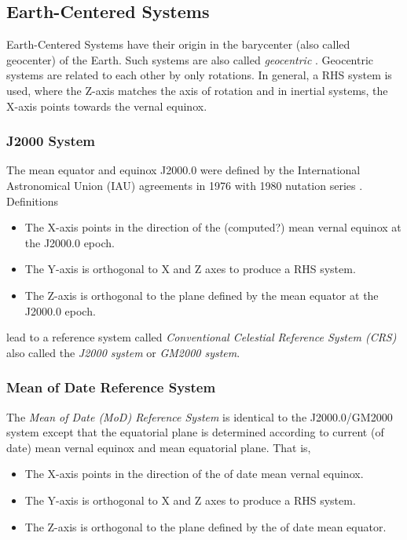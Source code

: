 \documentclass [12pt, a4paper] {article}
\begin{document}
\subsection{Earth-Centered Systems}
Earth-Centered Systems have their origin in the barycenter (also called geocenter) of
the Earth. Such systems are also called \emph{geocentric} \cite{gnss}.
Geocentric systems are related to each other by only rotations. 
In general, a RHS system is used, where the Z-axis matches the axis of rotation and in 
inertial systems, the X-axis points towards the vernal equinox.

\subsubsection{J2000 System}
The mean equator and equinox J2000.0 were defined by the International Astronomical Union 
(IAU) agreements in 1976 with 1980 nutation series \cite{GNSS}. Definitions
\begin {itemize}
  \item The X-axis points in the direction of the (computed?) mean vernal equinox at the 
  J2000.0 epoch.
  \item The Y-axis is orthogonal to X and Z axes to produce a RHS system.
  \item The Z-axis is orthogonal to the plane defined by the mean equator at the 
  J2000.0 epoch.
\end {itemize}
lead to a reference system called 
\emph{Conventional Celestial Reference System (CRS)}
also called the \emph{J2000 system} or \emph{GM2000 system}. 

\subsubsection{Mean of Date Reference System}
The \emph{Mean of Date (MoD) Reference System} is identical to the J2000.0/GM2000 system except
that the equatorial plane is determined according to current (of date) mean vernal equinox
and mean equatorial plane. That is, 
\begin {itemize}
  \item The X-axis points in the direction of the of date mean vernal equinox.
  \item The Y-axis is orthogonal to X and Z axes to produce a RHS system.
  \item The Z-axis is orthogonal to the plane defined by the of date mean equator.
\end {itemize}
\end{document}

